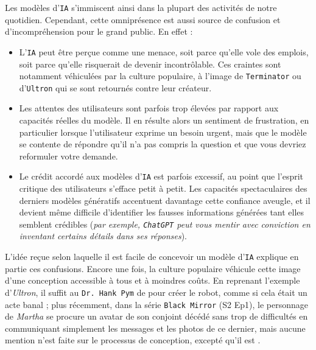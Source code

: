 		Les modèles d'\texttt{IA} s'immiscent ainsi dans la plupart des activités de notre quotidien.
		Cependant, cette omniprésence est aussi source de confusion et d'incompréhension pour le grand public.
		En effet :
		\begin{itemize}
			\item L'\texttt{IA} peut être perçue comme une menace, soit parce qu'elle vole des emplois, soit parce qu'elle risquerait de devenir incontrôlable.
			Ces craintes sont notamment véhiculées par la culture populaire, à l'image de \texttt{Terminator} ou d'\texttt{Ultron} qui se sont retournés contre leur créateur.
			\item Les attentes des utilisateurs sont parfois trop élevées par rapport aux capacités réelles du modèle.
			Il en résulte alors un sentiment de frustration, en particulier lorsque l'utilisateur exprime un besoin urgent, mais que le modèle se contente de répondre qu'il n'a pas compris la question et que vous devriez reformuler votre demande.
			\item Le crédit accordé aux modèles d'\texttt{IA} est parfois excessif, au point que l'esprit critique des utilisateurs s'efface petit à petit.
			Les capacités spectaculaires des derniers modèles génératifs accentuent davantage cette confiance aveugle, et il devient même difficile d'identifier les fausses informations générées tant elles semblent crédibles (\textit{par exemple, \texttt{ChatGPT} peut vous mentir avec conviction en inventant certains détails dans ses réponses}). 
		\end{itemize}
		
		L'idée reçue selon laquelle il est facile de concevoir un modèle d'\texttt{IA} explique en partie ces confusions.
		Encore une fois, la culture populaire véhicule cette image d'une conception accessible à tous et à moindres coûts.
		En reprenant l'exemple d'\textit{Ultron}, il suffit au \texttt{Dr. Hank Pym} de  pour créer le robot, comme si cela était un acte banal ; plus récemment, dans la série \texttt{Black Mirror} (S2 Ep1), le personnage de \textit{Martha} se procure un avatar de son conjoint décédé sans trop de difficultés en communiquant simplement les messages et les photos de ce dernier, mais aucune mention n'est faite sur le processus de conception, excepté qu'il est .
		\newline
		
